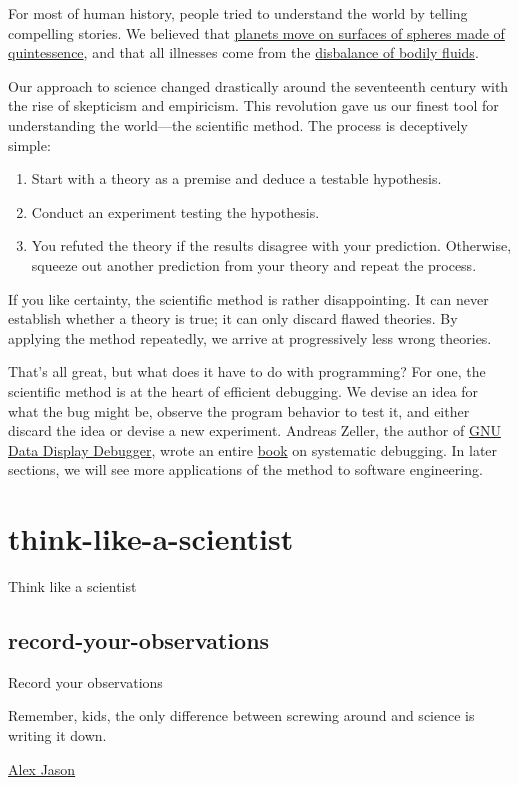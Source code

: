 \documentclass{article}
\begin{document}
For most of human history, people tried to understand the world by telling compelling stories.
We believed that \href{https://en.wikipedia.org/wiki/Celestial_spheres}{planets move on surfaces of spheres made of quintessence},
and that all illnesses come from the \href{https://en.wikipedia.org/wiki/Humorism}{disbalance of bodily fluids}.

Our approach to science changed drastically around the seventeenth century with the rise of skepticism and empiricism.
This revolution gave us our finest tool for understanding the world---the scientific method.
The process is deceptively simple:

\begin{enumerate}
\item Start with a theory as a premise and deduce a testable hypothesis.
\item Conduct an experiment testing the hypothesis.
\item You refuted the theory if the results disagree with your prediction.
  Otherwise, squeeze out another prediction from your theory and repeat the process.
\end{enumerate}

If you like certainty, the scientific method is rather disappointing.
It can never establish whether a theory is true;
it can only discard flawed theories.
By applying the method repeatedly, we arrive at progressively less wrong theories.

That's all great, but what does it have to do with programming?
For one, the scientific method is at the heart of efficient debugging.
We devise an idea for what the bug might be, observe the program behavior to test it, and either discard the idea or devise a new experiment.
Andreas Zeller, the author of \href{https://www.gnu.org/software/ddd/ddd.html}{GNU Data Display Debugger}, wrote an entire \href{https://www.whyprogramsfail.com/}{book} on systematic debugging.
In later sections, we will see more applications of the method to software engineering.

\section{think-like-a-scientist}{Think like a scientist}
\subsection{record-your-observations}{Record your observations}

\epigraph{
  Remember, kids, the only difference between screwing around and science is writing it down.
}{\href{https://www.reddit.com/r/mythbusters/comments/3wgqgv/the_origin_of_the_remember_kids_the_only/}{Alex Jason}}
\end{document}
